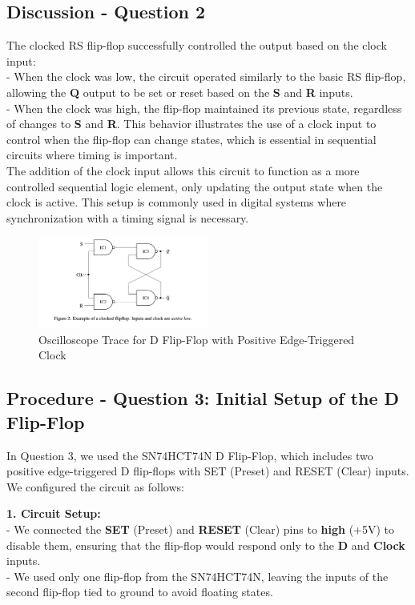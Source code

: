\documentclass{article}
\begin{document}
    \subsection*{\textbf{Discussion - Question 2}}
    The clocked RS flip-flop successfully controlled the output based on the clock input: \\ 
    - When the clock was low, the circuit operated similarly to the basic RS flip-flop, allowing the \textbf{Q} output to be set or reset based on the \textbf{S} and \textbf{R} inputs.
    \\
    - When the clock was high, the flip-flop maintained its previous state, regardless of changes to \textbf{S} and \textbf{R}. This behavior illustrates the use of a clock input to control when the flip-flop can change states, which is essential in sequential circuits where timing is important.
    \\

    The addition of the clock input allows this circuit to function as a more controlled sequential logic element, only updating the output state when the clock is active. This setup is commonly used in digital systems where synchronization with a timing signal is necessary.

    \begin{figure}[H]
        \centering
        \includegraphics[width=0.5\textwidth]{./img/Lab 11/11_2_1.png}  %
        \caption{Oscilloscope Trace for D Flip-Flop with Positive Edge-Triggered Clock}
        \label{fig:D_FlipFlop_Oscilloscope}
    \end{figure}
    
    \subsection*{\textbf{Procedure - Question 3: Initial Setup of the D Flip-Flop}}
    In Question 3, we used the SN74HCT74N D Flip-Flop, which includes two positive edge-triggered D flip-flops with SET (Preset) and RESET (Clear) inputs. We configured the circuit as follows:

    \textbf{1. Circuit Setup:} \\
    - We connected the \textbf{SET} (Preset) and \textbf{RESET} (Clear) pins to \textbf{high} (+5V) to disable them, ensuring that the flip-flop would respond only to the \textbf{D} and \textbf{Clock} inputs.
    \\
    - We used only one flip-flop from the SN74HCT74N, leaving the inputs of the second flip-flop tied to ground to avoid floating states.
    \\
\end{document}
